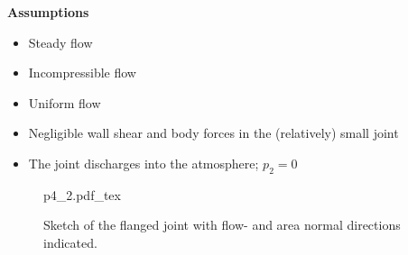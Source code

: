 \documentclass[a4paper]{article}
\newcommand{\incfig}[2][1]{%
  \def\svgwidth{#1\columnwidth}
  {#2.pdf_tex}
}
\numberwithin{equation}{problem}
\newcommand{\AUheading}[1]{%
  \par\vspace{.4\baselineskip}%
  {\sffamily\bfseries\color{AUblueDark}#1\par}%
  \nobreak%
}
\newenvironment{assumptions}[1][Assumptions]{%
  \AUheading{#1}
  \begin{itemize}[leftmargin=*,nosep]
}{\end{itemize}\par\medskip}
\begin{document}
\begin{assumptions}
  \item Steady flow
  \item Incompressible flow
  \item Uniform flow
  \item Negligible wall shear and body forces in the (relatively) small joint
  \item The joint discharges into the atmosphere; $p_2 = 0$
  \end{assumptions}

\begin{figure}[ht]
    \centering
    \incfig{p4_2}
    \caption{Sketch of the flanged joint with flow- and area normal directions indicated.}
    \label{fig:p4_2}
\end{figure}
\end{document}
